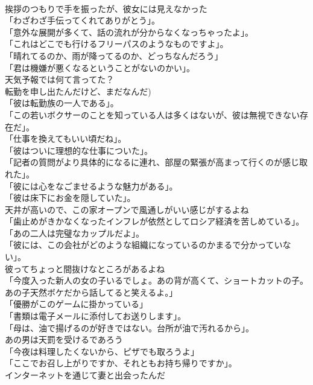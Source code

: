 \documentclass[8pt]{extreport}
\begin{document}
\begin{CJK}{UTF8}{min}
\\	挨拶のつもりで手を振ったが、彼女には見えなかった	
\\	「わざわざ手伝ってくれてありがとう」。	
\\	「意外な展開が多くて、話の流れが分からなくなっちゃったよ」。	
\\	「これはどこでも行けるフリーパスのようなものですよ」。	
\\	「晴れてるのか、雨が降ってるのか、どっちなんだろう」	
\\	「君は機嫌が悪くなるということがないのかい」。	
\\	天気予報では何て言ってた？	
\\	転勤を申し出たんだけど、まだなんだ)	
\\	「彼は転勤族の一人である」。	
\\	「この若いボクサーのことを知っている人は多くはないが、彼は無視できない存在だ」。	
\\	「仕事を換えてもいい頃だね」。	
\\	「彼はついに理想的な仕事についた」。	
\\	「記者の質問がより具体的になるに連れ、部屋の緊張が高まって行くのが感じ取れた」。	
\\	「彼には心をなごませるような魅力がある」。	
\\	「彼は床下にお金を隠していた」。	
\\	天井が高いので、この家オープンで風通しがいい感じがするよね	
\\	「歯止めがきかなくなったインフレが依然としてロシア経済を苦しめている」。	
\\	「あの二人は完璧なカップルだよ」。	
\\	「彼には、この会社がどのような組織になっているのかまるで分かっていない」。	
\\	彼ってちょっと間抜けなところがあるよね	
\\	「今度入った新人の女の子いるでしょ。あの背が高くて、ショートカットの子。あの子天然ボケだから話してると笑えるよ。」	
\\	「優勝がこのゲームに掛かっている」	
\\	「書類は電子メールに添付してお送りします」。	
\\	「母は、油で揚げるのが好きではない。台所が油で汚れるから」。	
\\	あの男は天罰を受けるであろう	
\\	「今夜は料理したくないから、ピザでも取ろうよ」	
\\	「ここでお召し上がりですか、それともお持ち帰りですか」。	
\\	インターネットを通じて妻と出会ったんだ	

\end{CJK}
\end{document}
